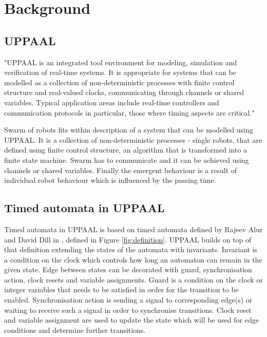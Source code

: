 \section{Background}

\subsection{UPPAAL}
"UPPAAL is an integrated tool environment for modeling, simulation and verification of real-time systems. It is appropriate for systems that can be modelled as a collection of non-deterministic processes with finite control structure and real-valued clocks, communicating through channels or shared variables. Typical application areas include real-time controllers and communication protocols in particular, those where timing aspects are critical." \cite{UPPAAL_in_a_Nutshell}

Swarm of robots fits within description of a system that can be modelled using UPPAAL. It is a collection of non-deterministic processes - single robots, that are defined using finite control structure, an algorithm that is transformed into a finite state machine. Swarm has to communicate and it can be achieved using channels or shared variables. Finally the emergent behaviour is a result of individual robot behaviour which is influenced by the passing time.


\subsection{Timed automata in UPPAAL}
Timed automata in UPPAAL is based on timed automata defined by Rajeev Alur and David Dill in \cite{Automata_For_Modeling_Real-Time_Systems}, defined in Figure \ref{fig:definition}. UPPAAL builds on top of that definition extending the states of the automata with invariants. Invariant is a condition on the clock which controls how long an automaton can remain in the given state. Edge between states can be decorated with guard, synchronisation action, clock resets and variable assignments. Guard is a condition on the clock or integer variables that needs to be satisfied in order for the transition to be enabled. Synchronisation action is sending a signal to corresponding edge(s) or waiting to receive such a signal in order to synchronise transitions. Clock reset and variable assignment are used to update the state which will be used for edge conditions and determine further transitions. \cite{UPPAAL_in_a_Nutshell}

